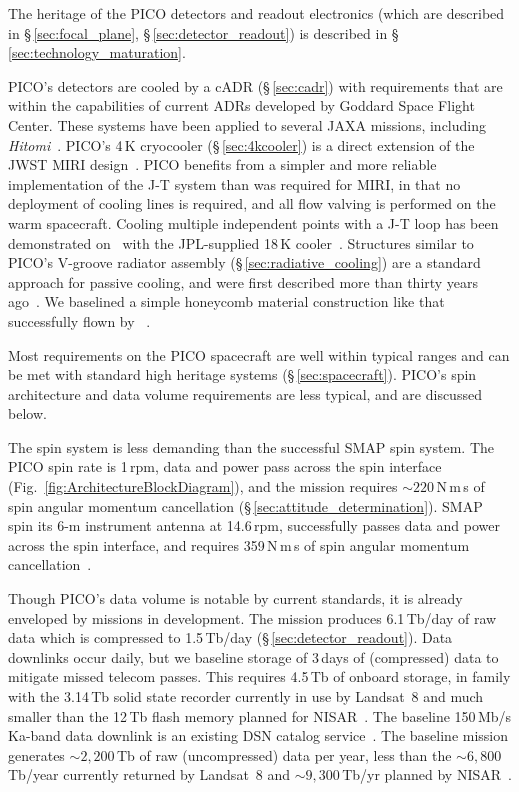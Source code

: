 The heritage of the PICO detectors and readout electronics (which are described in \S\,\ref{sec:focal_plane}, \S\,\ref{sec:detector_readout}) is described in \S\,\ref{sec:technology_maturation}.

PICO's detectors are cooled by a cADR (\S\,\ref{sec:cadr}) with requirements that are within the capabilities of current ADRs developed by Goddard Space Flight Center. These systems have been applied to several JAXA missions, including \textit{Hitomi}~\citep{Shirron2016}. PICO's 4\,K cryocooler (\S\,\ref{sec:4kcooler}) is a direct extension of the JWST MIRI design~\citep{Durand2008,Rabb2013}. PICO benefits from a simpler and more reliable implementation of the J-T system than was required for MIRI, in that no deployment of cooling lines is required, and all flow valving is performed on the warm spacecraft. Cooling multiple independent points with a J-T loop has been demonstrated on \planck\ with the JPL-supplied 18\,K cooler~\citep{Planck2011}. Structures similar to PICO's V-groove radiator assembly (\S\,\ref{sec:radiative_cooling}) are a standard approach for passive cooling, and were first described more than thirty years ago~\citep{Bard1987}. We baselined a simple honeycomb material construction like that successfully flown by \planck~\citep{ESA2009,Planck2011}.


Most requirements on the PICO spacecraft are well within typical ranges and can be met with standard high heritage systems (\S\,\ref{sec:spacecraft}). PICO's spin architecture and data volume requirements are less typical, and are discussed below.

The spin system is less demanding than the successful SMAP spin system. The PICO spin rate is 1\,rpm, data and power pass across the spin interface (Fig.~\ref{fig:ArchitectureBlockDiagram}), and the mission requires $\sim220$\,N\,m\,s of spin angular momentum cancellation (\S\,\ref{sec:attitude_determination}). SMAP spin its 6-m instrument antenna at 14.6\,rpm, successfully passes data and power across the spin interface, and requires 359\,N\,m\,s of spin angular momentum cancellation~\citep{Brown2016}.

Though PICO's data volume is notable by current standards, it is already enveloped by missions in development. The mission produces 6.1\,Tb/day of raw data which is compressed to 1.5\,Tb/day (\S\,\ref{sec:detector_readout}). Data downlinks occur daily, but we baseline storage of 3\,days of (compressed) data to mitigate missed telecom passes. This requires 4.5\,Tb of onboard storage, in family with the 3.14\,Tb solid state recorder currently in use by Landsat~8 and much smaller than the 12\,Tb flash memory planned for NISAR~\citep{Jasper2017}. The baseline 150\,Mb/s Ka-band data downlink is an existing DSN catalog service~\citep{DSN2015}. The baseline mission generates $\sim2,200$\,Tb of raw (uncompressed) data per year, less than the $\sim6,800$\,Tb/year currently returned by Landsat~8 and $\sim 9,300$\,Tb/yr planned by NISAR~\citep{Jasper2017}.

